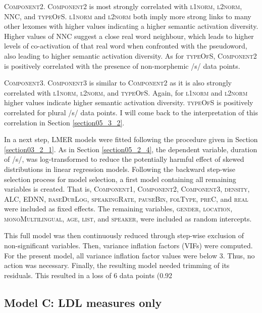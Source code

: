 \textsc{Component2}. \textsc{Component2} is most strongly correlated with \textsc{l1norm}, \textsc{l2norm}, \textsc{NNC}, and \textsc{typeOfS}. \textsc{l1norm} and \textsc{l2norm} both imply more strong links to many other lexomes with higher values indicating a higher semantic activation diversity. Higher values of \textsc{NNC} suggest a close real word neighbour, which leads to higher levels of co-activation of that real word when confronted with the pseudoword, also leading to higher semantic activation diversity. As for \textsc{typeOfS}, \textsc{Component2} is positively correlated with the presence of non-morphemic /s/ data points. 

\textsc{Component3}. \textsc{Component3} is similar to \textsc{Component2} as it is also strongly correlated with \textsc{l1norm}, \textsc{l2norm}, and \textsc{typeOfS}. Again, for \textsc{l1norm} and \textsc{l2norm} higher values indicate higher semantic activation diversity. \textsc{typeOfS} is positively correlated for plural /s/ data points. I will come back to the interpretation of this correlation in Section \ref{section05_3_2}. 

In a next step, LMER models were fitted following the procedure given in Section \ref{section03_2_1}. As in Section \ref{section05_2_4}, the dependent variable, duration of /s/, was log-transformed to reduce the potentially harmful effect of skewed distributions in linear regression models. Following the backward step-wise selection process for model selection, a first model containing all remaining variables is created. That is, \textsc{Component1}, \textsc{Component2}, \textsc{Component3}, \textsc{density}, \textsc{ALC}, \textsc{EDNN}, \textsc{baseDurLog}, \textsc{speakingRate}, \textsc{pauseBin}, \textsc{folType}, \textsc{preC}, and \textsc{real} were included as fixed effects. The remaining variables, \textsc{gender}, \textsc{location}, \textsc{monoMultilingual}, \textsc{age}, \textsc{list}, and \textsc{speaker}, were included as random intercepts. 

This full model was then continuously reduced through step-wise exclusion of non-significant variables. Then, variance inflation factors (VIFs) were computed. For the present model, all variance inflation factor values were below $3$. Thus, no action was necessary. Finally, the resulting model needed trimming of its residuals. This resulted in a loss of 6 data points (0.92 %

\subsection{Model C: LDL measures only}\label{section05_2_6}

